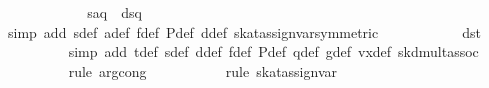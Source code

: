 \begin{isabellebody}
\ \ \ \ \isamarkupfalse%
\isanewline
\ \ \ \ \ \ \isamarkupfalse%
\ {}s{}{}a{}{}q{}{}{}\ {}\ d{}s{}{}q{}{}{}{}\isanewline
\ \ \ \ \ \ \ \ \isamarkupfalse%
\ {}simp\ add{}\ s{}def\ a{}def\ f{}def\ P{}def\ d{}def\ skat{}assign{}{}var{}symmetric{}{}\isanewline
\ \ \ \ \ \ \isamarkupfalse%
\ \isamarkupfalse%
\ {}{}{}{}\ {}\ d{}s{}{}t{}{}\isanewline
\ \ \ \ \ \ \ \ \isamarkupfalse%
\ {}simp\ add{}\ t{}def\ s{}def\ d{}def\ f{}def\ P{}def\ q{}def\ g{}def\ vx{}def\ skd{}mult{}assoc{}\isanewline
\ \ \ \ \ \ \ \ \isamarkupfalse%
\ {}rule\ arg{}cong{}\ \isamarkupfalse%
\isanewline
\ \ \ \ \ \ \ \ \isamarkupfalse%
\ {}rule\ skat{}assign{}{}var{}\isanewline

\end{isabellebody}
